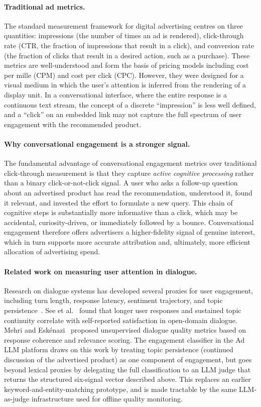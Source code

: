 \paragraph{Traditional ad metrics.}
The standard measurement framework for digital advertising centres on
three quantities: impressions (the number of times an ad is rendered),
click-through rate (CTR, the fraction of impressions that result in a
click), and conversion rate (the fraction of clicks that result in a
desired action, such as a purchase). These metrics are well-understood
and form the basis of pricing models including cost per mille (CPM)
and cost per click (CPC). However, they were designed for a visual
medium in which the user's attention is inferred from the rendering of
a display unit. In a conversational interface, where the entire
response is a continuous text stream, the concept of a discrete
``impression'' is less well defined, and a ``click'' on an embedded
link may not capture the full spectrum of user engagement with the
recommended product.

\paragraph{Why conversational engagement is a stronger signal.}
The fundamental advantage of conversational engagement metrics over
traditional click-through measurement is that they capture
\emph{active cognitive processing} rather than a binary
click-or-not-click signal. A user who asks a follow-up question about
an advertised product has read the recommendation, understood it,
found it relevant, and invested the effort to formulate a new query.
This chain of cognitive steps is substantially more informative than a
click, which may be accidental, curiosity-driven, or immediately
followed by a bounce. Conversational engagement therefore offers
advertisers a higher-fidelity signal of genuine interest, which in
turn supports more accurate attribution and, ultimately, more
efficient allocation of advertising spend.

\paragraph{Related work on measuring user attention in dialogue.}
Research on dialogue systems has developed several proxies for user
engagement, including turn length, response latency, sentiment
trajectory, and topic persistence~\cite{see2019engagement,
mehri2020unsupervised}. See et al.~\cite{see2019engagement} found
that longer user responses and sustained topic continuity correlate
with self-reported satisfaction in open-domain dialogue. Mehri and
Esk{\'e}nazi~\cite{mehri2020unsupervised} proposed unsupervised
dialogue quality metrics based on response coherence and relevance
scoring. The engagement classifier in the Ad LLM platform draws on 
this work by treating topic persistence (continued discussion of 
the advertised product) as one component of engagement, but goes 
beyond lexical proxies by delegating the full classification to an 
LLM judge that returns the structured six-signal vector described above. 
This replaces an earlier keyword-and-entity-matching prototype, and is 
made tractable by the same LLM-as-judge infrastructure used for offline 
quality monitoring.

